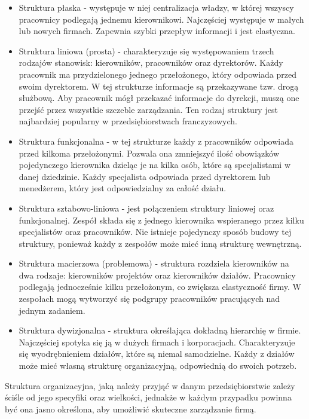 \begin{itemize}
    \item Struktura płaska - występuje w niej centralizacja władzy, w której wszyscy pracownicy podlegają jednemu kierownikowi. Najczęściej występuje w małych lub nowych firmach. Zapewnia szybki przepływ informacji i jest elastyczna.

    \item Struktura liniowa (prosta) - charakteryzuje się występowaniem trzech rodzajów stanowisk: kierowników, pracowników oraz dyrektorów. Każdy pracownik ma przydzielonego jednego przełożonego, który odpowiada przed swoim dyrektorem. W tej strukturze informacje są przekazywane tzw. drogą służbową. Aby pracownik mógł przekazać informacje do dyrekcji, muszą one przejść przez wszystkie szczeble zarządzania. Ten rodzaj struktury jest najbardziej popularny w przedsiębiorstwach franczyzowych.

    \item Struktura funkcjonalna - w tej strukturze każdy z pracowników odpowiada przed kilkoma przełożonymi. Pozwala ona zmniejszyć ilość obowiązków pojedynczego kierownika dzieląc je na kilka osób, które są specjalistami w danej dziedzinie. Każdy specjalista odpowiada przed dyrektorem lub menedżerem, który jest odpowiedzialny za całość działu.

    \item Struktura sztabowo-liniowa - jest połączeniem struktury liniowej oraz funkcjonalnej. Zespół składa się z jednego kierownika wspieranego przez kilku specjalistów oraz pracowników. Nie istnieje pojedynczy sposób budowy tej struktury, ponieważ każdy z zespołów może mieć inną strukturę wewnętrzną.

    \item Struktura macierzowa (problemowa) - struktura rozdziela kierowników na dwa rodzaje: kierowników projektów oraz kierowników działów. Pracownicy podlegają jednocześnie kilku przełożonym, co zwiększa elastyczność firmy. W zespołach mogą wytworzyć się podgrupy pracowników pracujących nad jednym zadaniem.

    \item Struktura dywizjonalna - struktura określająca dokładną hierarchię w firmie. Najczęściej spotyka się ją w dużych firmach i korporacjach. Charakteryzuje się wyodrębnieniem działów, które są niemal samodzielne. Każdy z działów może mieć własną strukturę organizacyjną, odpowiednią do swoich potrzeb.
\end{itemize}

Struktura organizacyjna, jaką należy przyjąć w danym przedsiębiorstwie zależy ściśle od jego specyfiki oraz wielkości, jednakże w każdym przypadku powinna być ona jasno określona, aby umożliwić skuteczne zarządzanie firmą.

